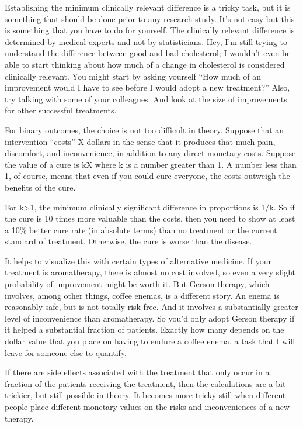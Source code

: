 \documentclass[
  letterpaper,
  DIV=11,
  numbers=noendperiod]{scrreprt}
\begin{document}
Establishing the minimum clinically relevant difference is a tricky
task, but it is something that should be done prior to any research
study. It's not easy but this is something that you have to do for
yourself. The clinically relevant difference is determined by medical
experts and not by statisticians. Hey, I'm still trying to understand
the difference between good and bad cholesterol; I wouldn't even be able
to start thinking about how much of a change in cholesterol is
considered clinically relevant. You might start by asking yourself ``How
much of an improvement would I have to see before I would adopt a new
treatment?'' Also, try talking with some of your colleagues. And look at
the size of improvements for other successful treatments.

For binary outcomes, the choice is not too difficult in theory. Suppose
that an intervention ``costs'' X dollars in the sense that it produces
that much pain, discomfort, and inconvenience, in addition to any direct
monetary costs. Suppose the value of a cure is kX where k is a number
greater than 1. A number less than 1, of course, means that even if you
could cure everyone, the costs outweigh the benefits of the cure.

For k\textgreater1, the minimum clinically significant difference in
proportions is 1/k. So if the cure is 10 times more valuable than the
costs, then you need to show at least a 10\% better cure rate (in
absolute terms) than no treatment or the current standard of treatment.
Otherwise, the cure is worse than the disease.

It helps to visualize this with certain types of alternative medicine.
If your treatment is aromatherapy, there is almost no cost involved, so
even a very slight probability of improvement might be worth it. But
Gerson therapy, which involves, among other things, coffee enemas, is a
different story. An enema is reasonably safe, but is not totally risk
free. And it involves a substantially greater level of inconvenience
than aromatherapy. So you'd only adopt Gerson therapy if it helped a
substantial fraction of patients. Exactly how many depends on the dollar
value that you place on having to endure a coffee enema, a task that I
will leave for someone else to quantify.

If there are side effects associated with the treatment that only occur
in a fraction of the patients receiving the treatment, then the
calculations are a bit trickier, but still possible in theory. It
becomes more tricky still when different people place different monetary
values on the risks and inconveniences of a new therapy.
\end{document}
